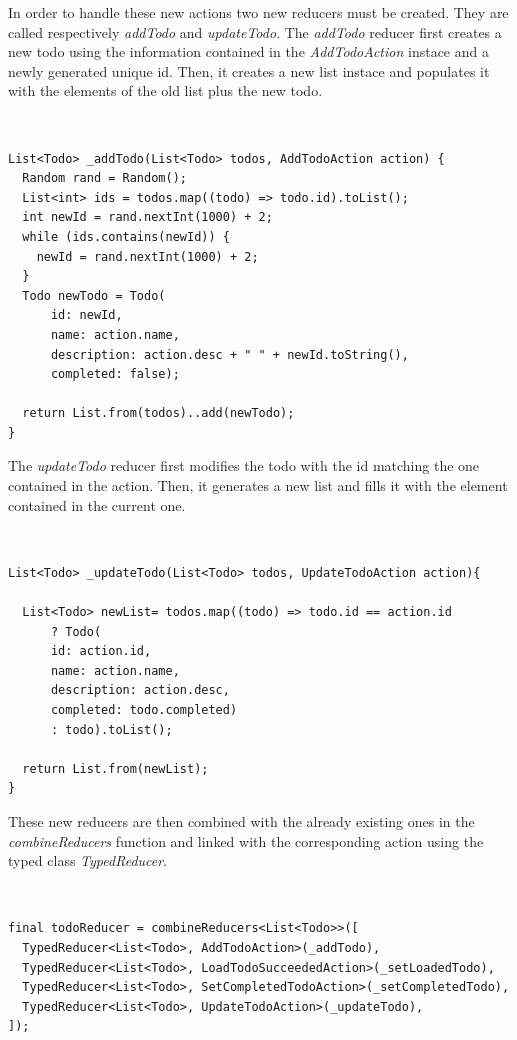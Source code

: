 In order to handle these new actions two new reducers must be created. They are called respectively \textit{addTodo} and \textit{updateTodo}. The \textit{addTodo} reducer first creates a new todo using the information contained in the \textit{AddTodoAction}  instace and a newly generated unique id. Then, it creates a new list instace and populates it with the elements of the old list plus the new todo.
\begin{code}
\mbox{}\\
 \mbox{}
		\label{code:2.14}
\begin{verbatim}
List<Todo> _addTodo(List<Todo> todos, AddTodoAction action) {
  Random rand = Random();
  List<int> ids = todos.map((todo) => todo.id).toList();
  int newId = rand.nextInt(1000) + 2;
  while (ids.contains(newId)) {
    newId = rand.nextInt(1000) + 2;
  }
  Todo newTodo = Todo(
      id: newId,
      name: action.name,
      description: action.desc + " " + newId.toString(),
      completed: false);

  return List.from(todos)..add(newTodo);
}
\end{verbatim}
\mbox{}
\end{code}

The \textit{updateTodo} reducer first modifies the todo with the id matching the one contained in the action. Then, it generates a new list and fills it with the element contained in the current one.
\begin{code}
\mbox{}\\
 \mbox{}
		\label{code:2.14}
\begin{verbatim}
List<Todo> _updateTodo(List<Todo> todos, UpdateTodoAction action){

  List<Todo> newList= todos.map((todo) => todo.id == action.id
      ? Todo(
      id: action.id,
      name: action.name,
      description: action.desc,
      completed: todo.completed)
      : todo).toList();

  return List.from(newList);
}
\end{verbatim}
\mbox{}
\end{code}

These new reducers are then combined with the already existing ones in the \textit{combineReducers} function and linked with the corresponding action using the typed class \textit{TypedReducer}.
\begin{code}
\mbox{}\\
 \mbox{}
		\label{code:2.14}
\begin{verbatim}
final todoReducer = combineReducers<List<Todo>>([
  TypedReducer<List<Todo>, AddTodoAction>(_addTodo),
  TypedReducer<List<Todo>, LoadTodoSucceededAction>(_setLoadedTodo),
  TypedReducer<List<Todo>, SetCompletedTodoAction>(_setCompletedTodo),
  TypedReducer<List<Todo>, UpdateTodoAction>(_updateTodo),
]);
\end{verbatim}
\mbox{}
\end{code}

